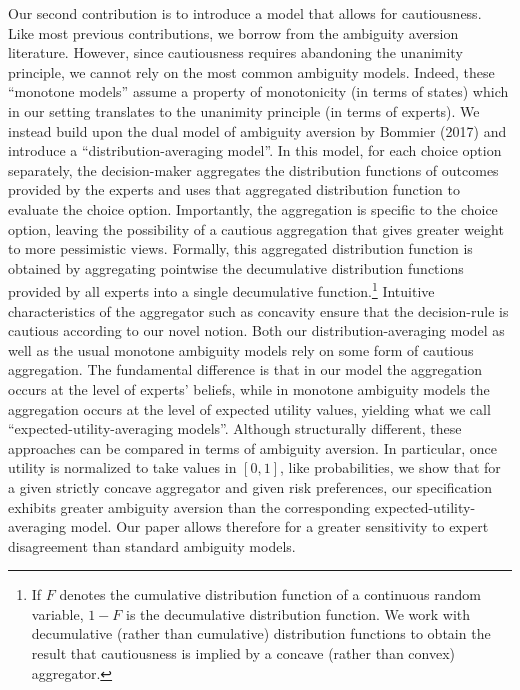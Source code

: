 \documentclass[12pt,a4paper]{article}
\newenvironment{original}
  {\par\noindent\ignorespaces}
  {\par}
\begin{document}
\begin{original}
Our second contribution is to introduce a model that allows for cautiousness. Like most previous contributions, we borrow from the ambiguity aversion literature. However, since cautiousness requires abandoning the unanimity principle, we cannot rely on the most common ambiguity models. Indeed, these ``monotone models'' assume a property of monotonicity (in terms of states) which in our setting translates to the unanimity principle (in terms of experts). We instead build upon the dual model of ambiguity aversion by Bommier (2017) and introduce a ``distribution-averaging model''. In this model, for each choice option separately, the decision-maker aggregates the distribution functions of outcomes provided by the experts and uses that aggregated distribution function to evaluate the choice option. Importantly, the aggregation is specific to the choice option, leaving the possibility of a cautious aggregation that gives greater weight to more pessimistic views. Formally, this aggregated distribution function is obtained by aggregating pointwise the decumulative distribution functions provided by all experts into a single decumulative function.\footnote{If $F$ denotes the cumulative distribution function of a continuous random variable, $1-F$ is the decumulative distribution function. We work with decumulative (rather than cumulative) distribution functions to obtain the result that cautiousness is implied by a concave (rather than convex) aggregator.} Intuitive characteristics of the aggregator such as concavity ensure that the decision-rule is cautious according to our novel notion. Both our distribution-averaging model as well as the usual monotone ambiguity models rely on some form of cautious aggregation. The fundamental difference is that in our model the aggregation occurs at the level of experts' beliefs, while in monotone ambiguity models the aggregation occurs at the level of expected utility values, yielding what we call ``expected-utility-averaging models''. Although structurally different, these approaches can be compared in terms of ambiguity aversion. In particular, once utility is normalized to take values in $[0,1]$, like probabilities, we show that for a given strictly concave aggregator and given risk preferences, our specification exhibits greater ambiguity aversion than the corresponding expected-utility-averaging model. Our paper allows therefore for a greater sensitivity to expert disagreement than standard ambiguity models.
\end{original}
\end{document}
